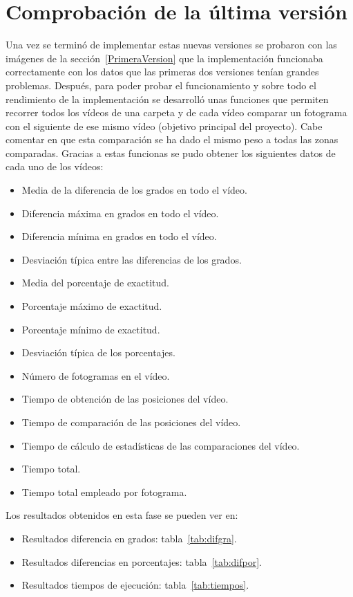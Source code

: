 \section{Comprobación de la última versión}
Una vez se terminó de implementar estas nuevas versiones se probaron con las imágenes de la sección~\ref{PrimeraVersion} que la implementación funcionaba correctamente con los datos que las primeras dos versiones tenían grandes problemas. Después, para poder probar el funcionamiento y sobre todo el rendimiento de la implementación se desarrolló unas funciones que permiten recorrer todos los vídeos de una carpeta y de cada vídeo comparar un fotograma con el siguiente de ese mismo vídeo (objetivo principal del proyecto). Cabe comentar en que esta comparación se ha dado el mismo peso a todas las zonas comparadas. Gracias a estas funcionas se pudo obtener los siguientes datos de cada uno de los vídeos:
\begin{itemize}
	\item Media de la diferencia de los grados en todo el vídeo.
	\item Diferencia máxima en grados en todo el vídeo.
	\item Diferencia mínima en grados en todo el vídeo.
	\item Desviación típica entre las diferencias de los grados.
	\item Media del porcentaje de exactitud.
	\item Porcentaje máximo de exactitud.
	\item Porcentaje mínimo de exactitud.
	\item Desviación típica de los porcentajes.
	\item Número de fotogramas en el vídeo.
	\item Tiempo de obtención de las posiciones del vídeo.
	\item Tiempo de comparación de las posiciones del vídeo.
	\item Tiempo de cálculo de estadísticas de las comparaciones del vídeo.
	\item Tiempo total.
	\item Tiempo total empleado por fotograma.
\end{itemize}

Los resultados obtenidos en esta fase se pueden ver en:
\begin{itemize}
	\item Resultados diferencia en grados: tabla~\ref{tab:difgra}.
	\item Resultados diferencias en porcentajes: tabla~\ref{tab:difpor}.
	\item Resultados tiempos de ejecución: tabla~\ref{tab:tiempos}.
\end{itemize}


